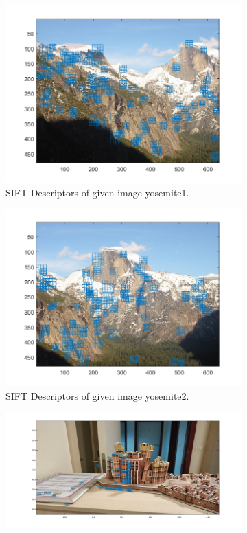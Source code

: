 \documentclass{article}
\begin{document}
\begin{figure}[!htb]
\begin{subfigure}{.5\textwidth}
  \centering
  \includegraphics[width=.99\textwidth]{yosemite1_sift.png}
  \caption{SIFT Descriptors of given image yosemite1.}
\end{subfigure}%
\begin{subfigure}{.5\textwidth}
  \centering
  \includegraphics[width=.99\textwidth]{yosemite2_sift.png}
  \caption{SIFT Descriptors of given image yosemite2.}
\end{subfigure}
\begin{subfigure}{.5\textwidth}
  \centering
  \includegraphics[width=.99\textwidth]{got1_sift.png}

\end{subfigure}
\end{figure}
\end{document}

